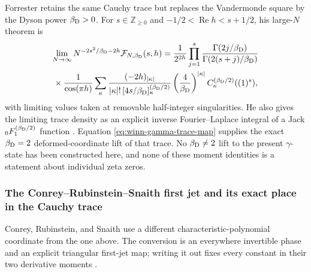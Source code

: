 Forrester retains the same Cauchy trace but replaces the Vandermonde square by the
Dyson power $\beta_{\rm D}>0$.  For $s\in\mathbb Z_{\geq0}$ and
$-1/2<\operatorname{Re}h<s+1/2$, his large-$N$ theorem is
\begin{multline}
 \lim_{N\to\infty}N^{-2s^2/\beta_{\rm D}-2h}
 \mathcal F_{N,\beta_{\rm D}}(s,h)
 =\frac1{2^{2h}}
 \prod_{j=1}^{s}
 \frac{\Gamma(2j/\beta_{\rm D})}
 {\Gamma(2(s+j)/\beta_{\rm D})}\\
 {}\times\frac1{\cos(\pi h)}
 \sum_\kappa
 \frac{(-2h)_{|\kappa|}}
 {|\kappa|!\,[4s/\beta_{\rm D}]_\kappa^{(\beta_{\rm D}/2)}}
 \left(\frac4{\beta_{\rm D}}\right)^{|\kappa|}
 C_\kappa^{(\beta_{\rm D}/2)}((1)^s),
 \label{eq:forrester-large-N-continuous-h}
\end{multline}
with limiting values taken at removable half-integer singularities.  He also gives the
limiting trace density as an explicit inverse Fourier--Laplace integral of a Jack
${}_0F_1^{(\beta_{\rm D}/2)}$ function
\cite[Thms.~1.1--1.2]{forrester2022}.  Equation
\eqref{eq:winn-gamma-trace-map} supplies the exact $\beta_{\rm D}=2$ deformed-coordinate
lift of that trace.  No $\beta_{\rm D}\ne2$ lift to the present $\gamma$-state has been
constructed here, and none of these moment identities is a statement about individual
zeta zeros.

\subsubsection{The Conrey--Rubinstein--Snaith first jet and its exact
place in the Cauchy trace}

Conrey, Rubinstein, and Snaith use a different characteristic-polynomial
coordinate from the one above.  The conversion is an everywhere invertible phase and
an explicit triangular first-jet map; writing it out fixes every constant in their two
derivative moments \cite[\S\S1--4]{conreyRubinsteinSnaith2006}.

